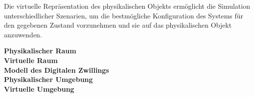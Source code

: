 Die virtuelle Repräsentation des physikalischen Objekts ermöglicht die Simulation unterschiedlicher Szenarien, um die bestmögliche Konfiguration des Systems für den gegebenen Zustand vorzunehmen und sie auf das physikalischen Objekt anzuwenden. 

\textbf{Physikalischer Raum} \\

\textbf{Virtuelle Raum} \\

\textbf{Modell des Digitalen Zwillings} \\

\textbf{Physikalischer Umgebung} \\

\textbf{Virtuelle Umgebung} \\




